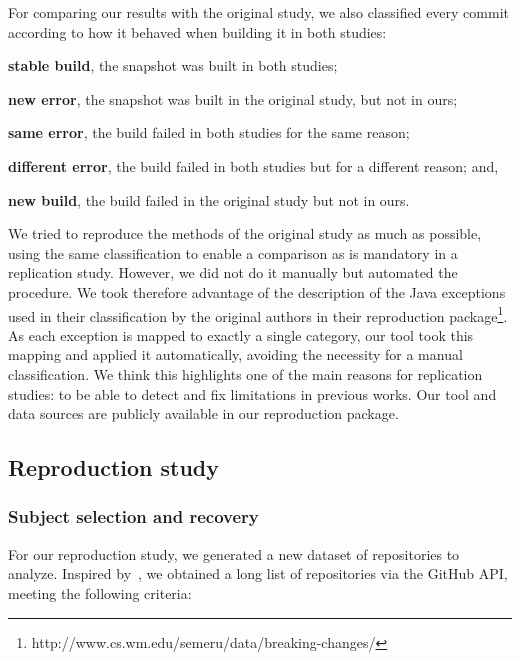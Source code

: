 For comparing our results with the original study, we also classified every commit according to how it behaved when building it in both studies:
\begin{inparaenum}[\bf(1)]
  \item \textbf{stable build}, the snapshot was built in both studies;
  \item \textbf{new error}, the snapshot was built in the original study, but not in ours;
  \item \textbf{same error}, the build failed in both studies for the same reason;
  \item \textbf{different error}, the build failed in both studies but for a different reason; and,
  \item \textbf{new build}, the build failed in the original study but not in ours.
\end{inparaenum}

We tried to reproduce the methods of the original study as much as possible, using the same classification to enable a comparison as is mandatory in a replication study.
However, we did not do it manually but automated the procedure.
We took therefore advantage of the description of the Java exceptions used in their classification by the original authors in their reproduction package\footnote{http://www.cs.wm.edu/semeru/data/breaking-changes/}.
As each exception is mapped to exactly a single category, our tool took this mapping and applied it automatically, avoiding the necessity for a manual classification.
We think this highlights one of the main reasons for replication studies: to be able to detect and fix limitations in previous works.
Our tool and data sources are publicly available in our reproduction package.


\subsection{Reproduction study}

\subsubsection{Subject selection and recovery}

For our reproduction study, we generated a new dataset of repositories to analyze. Inspired by~\cite{Sulir:2016:QSJ:3001878.3001882}, we obtained a long list of repositories via the GitHub API, meeting the following criteria:

